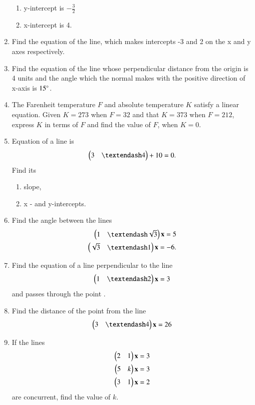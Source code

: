 \begin{enumerate}[label=\arabic*.,ref=\thesubsection.\theenumi]
\begin{enumerate}
\item y-intercept is $-\frac{3}{2}$
\item x-intercept is 4.
\end{enumerate}
\item Find the equation of the line, which makes intercepts -3 and 2 on the x and y axes respectively.
\item Find the equation of the line whose perpendicular distance from the origin is 4 units and the angle which the normal makes with the positive direction of x-axis is $15\degree$.
\item The Farenheit temperature $F$ and absolute temperature $K$ satisfy a linear equation.  Given $K=273$ when $F=32$ and that $K=373$  when $F=212$, express $K$ in terms of $F$ and find the value of $F$, when $K=0$.
\item Equation of a line is 
\begin{align}
\myvec{3 & – 4} + 10 = 0. 
\end{align}
Find its 
\begin{enumerate}
\item  slope, 
\item  x - and y-intercepts.
\end{enumerate}
\item Find the angle between the lines 
\begin{align}
\myvec{1 & – \sqrt{3}}\vec{x}  = 5
\\
\myvec{\sqrt{3} & –1}\vec{x}  = -6
. 
\end{align}
\item Find the equation of a line perpendicular to the line 
\begin{align}
\myvec{1 & – 2}\vec{x}  = 3
\end{align}
%
and passes through the point .
\item Find the distance of the point  from the line 
\begin{align}
\myvec{3 & – 4}\vec{x}  = 26
\end{align}
\item If the lines 
\begin{align}
\begin{pmatrix}2 & 1\end{pmatrix}\mathbf{x}  = 3
\\
\begin{pmatrix}5 & k\end{pmatrix}\mathbf{x}  = 3
\\
\begin{pmatrix}3 & 1\end{pmatrix}\mathbf{x}  = 2
\end{align}
%
are concurrent, find the value of $k$.

\end{enumerate}
